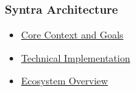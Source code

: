 \documentclass[12pt,a4paper]{article}
\providecommand{\tightlist}{\setlength{\itemsep}{0pt}\setlength{\parskip}{0pt}}
\begin{document}
\subsubsection{Syntra Architecture}\label{syntra-architecture}

\begin{itemize}
\tightlist
\item
  \href{syntra-core-context-and-goals.html}{Core Context and Goals}
\item
  \href{syntra-technical-implementation.html}{Technical Implementation}
\item
  \href{syntra-ecosystem-overview.html}{Ecosystem Overview}
\end{itemize}
\end{document}
